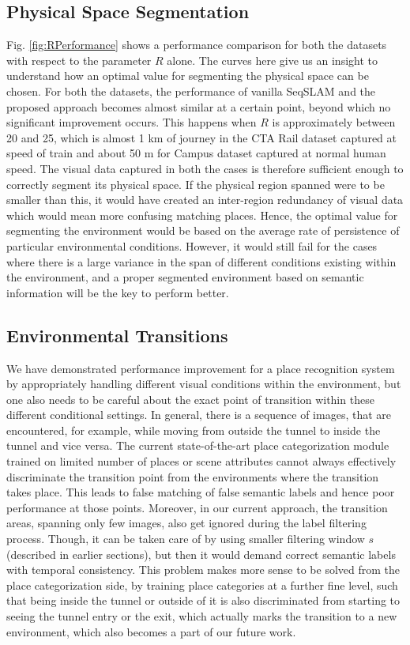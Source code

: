 \documentclass[letterpaper, 10 pt, conference]{ieeeconf}  %
\begin{document}
\subsection{Physical Space Segmentation}
Fig. \ref{fig:RPerformance} shows a performance comparison for both the datasets with respect to the parameter $R$ alone. The curves here give us an insight to understand how an optimal value for segmenting the physical space can be chosen. For both the datasets, the performance of vanilla SeqSLAM and the proposed approach becomes almost similar at a certain point, beyond which no significant improvement occurs. This happens when $R$ is approximately between 20 and 25, which is almost 1 km of journey in the CTA Rail dataset captured at speed of train and about 50 m for Campus dataset captured at normal human speed. The visual data captured in both the cases is therefore sufficient enough to correctly segment its physical space. If the physical region spanned were to be smaller than this, it would have created an inter-region redundancy of visual data which would mean more confusing matching places. Hence, the optimal value for segmenting the environment would be based on the average rate of persistence of particular environmental conditions. However, it would still fail for the cases where there is a large variance in the span of different conditions existing within the environment, and a proper segmented environment based on semantic information will be the key to perform better.

\subsection{Environmental Transitions}
We have demonstrated performance improvement for a place recognition system by appropriately handling different visual conditions within the environment, but one also needs to be careful about the exact point of transition within these different conditional settings. In general, there is a sequence of images, that are encountered, for example, while moving from outside the tunnel to inside the tunnel and vice versa. The current state-of-the-art place categorization module trained on limited number of places or scene attributes cannot always effectively discriminate the transition point from the environments where the transition takes place. This leads to false matching of false semantic labels and hence poor performance at those points. Moreover, in our current approach, the transition areas, spanning only few images, also get ignored during the label filtering process. Though, it can be taken care of by using smaller filtering window $s$ (described in earlier sections), but then it would demand correct semantic labels with temporal consistency. This problem makes more sense to be solved from the place categorization side, by training place categories at a further fine level, such that being inside the tunnel or outside of it is also discriminated from starting to seeing the tunnel entry or the exit, which actually marks the transition to a new environment, which also becomes a part of our future work.
\end{document}
